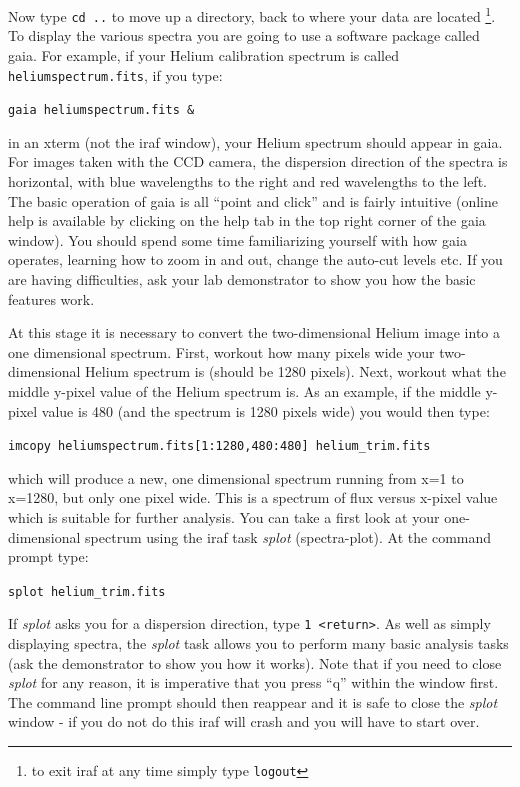 \documentclass[12pt]{article}
\begin{document}
Now type {\tt cd ..} to move up a directory, back to where
your data are located \footnote{to exit {\sc iraf} at any time simply type {\tt logout}}. To display the various spectra you are going to use a software package called {\sc gaia}. For example, if your Helium calibration spectrum is
called {\tt heliumspectrum.fits}, if you type:

{\tt gaia heliumspectrum.fits \&}

in an xterm (not the {\sc iraf} window), your Helium spectrum should appear in {\sc gaia}. For images taken with the CCD camera, the 
dispersion direction of the spectra is horizontal, with blue
wavelengths to the right and red wavelengths to the left. The basic
operation of {\sc gaia} is all ``point and
click'' and is fairly intuitive (online help is available by
clicking on the {\sc help} tab in the top right corner of the {\sc
gaia} window). You should spend some time familiarizing yourself with
how {\sc gaia} operates, learning how to zoom in and out, change the
auto-cut levels etc. If you are having difficulties, ask your lab
demonstrator to show you how the basic features work.

At this stage it is necessary to convert the two-dimensional Helium
image into a one dimensional spectrum. First, workout how many pixels
wide your two-dimensional Helium spectrum is (should be 1280 pixels). Next, workout what
the middle y-pixel value of the Helium spectrum is. As an example, if
the middle y-pixel value is 480 (and the spectrum is 1280 pixels wide) you would then type:

{\tt imcopy heliumspectrum.fits[1:1280,480:480] helium\verb,_,trim.fits}

which will produce a new, one dimensional spectrum running from x=1
to x=1280, but only one pixel wide. This is a spectrum of flux versus
x-pixel value which is suitable for further analysis. You can take a
first look at your one-dimensional spectrum using the {\sc iraf} task 
{\it splot} (spectra-plot). At the command prompt type:

{\tt splot helium\verb,_trim,.fits}

If {\it splot} asks you for a dispersion direction, type {\tt 1
  <return>}. As well as simply displaying spectra, the {\it splot} task allows you
to perform many basic analysis tasks (ask the demonstrator to show you
how it works).  Note that if you need to close {\it splot} for any reason,
it is imperative that you press ``q'' within the window first. The command
line prompt should then reappear and it is safe to close the {\it splot} window - 
if you do not do this {\sc iraf} will crash and you will have to start over.
\end{document}
